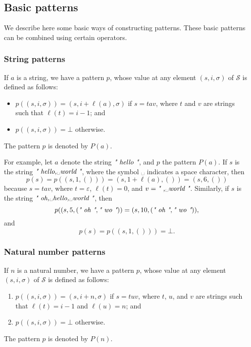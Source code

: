 \documentclass{article}
\begin{document}
\subsection{Basic patterns}
\label{sec:2ynr2sf4}

We describe here some basic ways of constructing patterns.  These
basic patterns can be combined using certain operators.

\subsubsection{String patterns}
\label{sec:zn6czomy}

If \(a\) is a string, we have a pattern \(p\), whose value at any
element \((s, i, \sigma)\) of \(\mathcal{S}\) is defined as follows:
\begin{itemize}
\item \(p((s, i, \sigma)) = (s, i + \ell(a), \sigma)\) if \(s = tav\),
  where \(t\) and \(v\) are strings such that \(\ell(t) = i - 1\); and
\item \(p((s, i, \sigma)) = \bot\) otherwise.
\end{itemize}
The pattern \(p\) is denoted by \(P(a)\).

For example, let \(a\) denote the string \(\text{\itshape" hello "}\), and \(p\)
the pattern \(P(a)\).  If \(s\) is the string \(\text{\itshape" hello,␣world "}\),
where the symbol ␣ indicates a space character, then
\begin{displaymath}
  p(s) =
  p((s, 1, ())) =
  (s, 1 + \ell(a), ()) =
  (s, 6, ())
\end{displaymath}
because \(s = tav\), where \(t = \varepsilon\), \(\ell(t) = 0\), and
\(v = \text{\itshape" ,␣world "}\).  Similarly, if \(s\) is the string
\(\text{\itshape" oh,␣hello,␣world "}\), then
\begin{displaymath}
  p((s, 5, (\text{\itshape" oh "}, \text{\itshape" wo "})) = (s, 10, (\text{\itshape" oh "}, \text{\itshape" wo "})),
\end{displaymath}
and
\begin{displaymath}
  p(s) = p((s, 1, ())) = \bot.
\end{displaymath}

\subsubsection{Natural number patterns}
\label{sec:amrbrlnv}

If \(n\) is a natural number, we have a pattern \(p\), whose value at
any element \((s, i, \sigma)\) of \(\mathcal{S}\) is defined as
follows:
\begin{enumerate}
\item \(p((s, i, \sigma)) = (s, i + n, \sigma)\) if \(s = tuv\), where
  \(t\), \(u\), and \(v\) are strings such that \(\ell(t) = i - 1\)
  and \(\ell(u) = n\); and
\item \(p((s, i, \sigma)) = \bot\) otherwise.
\end{enumerate}
The pattern \(p\) is denoted by \(P(n)\).
\end{document}
